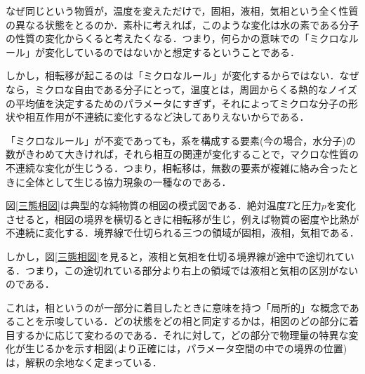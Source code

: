 \documentclass[a4paper,11pt]{jsreport}
\begin{document}
なぜ同じという物質が，温度を変えただけで，固相，液相，気相という全く性質の異なる状態をとるのか．素朴に考えれば，このような変化は水の素である分子の性質の変化からくると考えたくなる．つまり，何らかの意味での「ミクロなルール」が変化しているのではないかと想定するということである．\par
しかし，相転移が起こるのは「ミクロなルール」が変化するからではない．なぜなら，ミクロな自由である分子にとって，温度とは，周囲からくる熱的なノイズの平均値を決定するためのパラメータにすぎず，それによってミクロな分子の形状や相互作用が不連続に変化するなど決してありえないからである．\par
「ミクロなルール」が不変であっても，系を構成する要素(今の場合，水分子)の数がきわめて大きければ，それら相互の関連が変化することで，マクロな性質の不連続な変化が生じうる．つまり，相転移は，無数の要素が複雑に絡み合ったときに全体として生じる協力現象の一種なのである．\par
図\ref{三態相図}は典型的な純物質の相図の模式図である．絶対温度$T$と圧力$p$を変化させると，相図の境界を横切るときに相転移が生じ，例えば物質の密度や比熱が不連続に変化する．境界線で仕切られる三つの領域が固相，液相，気相である．\par
しかし，図\ref{三態相図}を見ると，液相と気相を仕切る境界線が途中で途切れている．つまり，この途切れている部分より右上の領域では液相と気相の区別がないのである．\par
これは，相というのが一部分に着目したときに意味を持つ「局所的」な概念であることを示唆している．どの状態をどの相と同定するかは，相図のどの部分に着目するかに応じて変わるのである．それに対して，どの部分で物理量の特異な変化が生じるかを示す相図(より正確には，パラメータ空間の中での境界の位置)は，解釈の余地なく定まっている．\par
\end{document}
